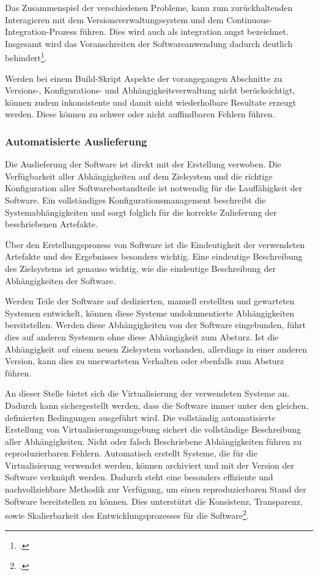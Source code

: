 Das Zusammenspiel der verschiedenen Probleme, kann zum zurückhaltenden Interagieren mit dem Versionsverwaltungssystem und dem Continuous-Integration-Prozess führen. Dies wird auch als \glqq integration angst\grqq{} bezeichnet. Insgesamt wird das Voranschreiten der Softwareanwendung dadurch deutlich behindert\footcite[vgl.][S. 3 ff]{ci-is-not-build-systems}.

Werden bei einem Build-Skript Aspekte der vorangegangen Abschnitte zu Versions-, Konfigurations- und Abhängigkeitsverwaltung nicht berücksichtigt, können zudem inkonsistente und damit nicht
wiederholbare Resultate erzeugt werden. Diese können zu schwer oder nicht auffindbaren Fehlern führen.

\subsubsection{Automatisierte Auslieferung}

Die Auslieferung der Software ist direkt mit der Erstellung verwoben. Die Verfügbarkeit aller Abhängigkeiten auf dem Zielsystem und die richtige Konfiguration aller Softwarebestandteile ist notwendig für die Lauffähigkeit der Software.
Ein vollständiges Konfigurationsmanagement beschreibt die Systemabhängigkeiten und sorgt folglich für die korrekte Zulieferung der beschriebenen Artefakte.

Über den Erstellungsprozess von Software ist die Eindeutigkeit der verwendeten Artefakte und des Ergebnisses besonders wichtig. Eine eindeutige Beschreibung des Zielsystems ist genauso wichtig, wie die eindeutige Beschreibung der Abhängigkeiten der Software.

Werden Teile der Software auf dedizierten, manuell erstellten und gewarteten Systemen entwickelt, können diese Systeme undokumentierte Abhängigkeiten bereitstellen. Werden diese Abhängigkeiten von der Software eingebunden, führt dies auf anderen Systemen ohne diese Abhängigkeit zum Absturz. Ist die Abhängigkeit auf einem neuen Zielsystem vorhanden, allerdings in einer anderen Version, kann dies zu unerwartetem Verhalten oder ebenfalls zum Absturz führen.

An dieser Stelle bietet sich die Virtualisierung der verwendeten Systeme an. Dadurch kann sichergestellt werden, dass die Software immer unter den gleichen, definierten Bedingungen ausgeführt wird. Die vollständig automatisierte Erstellung von Virtualisierungsumgebung sichert die vollständige Beschreibung aller Abhängigkeiten. Nicht oder falsch Beschriebene Abhängigkeiten führen zu reproduzierbaren Fehlern.
Automatisch erstellt Systeme, die für die Virtualisierung verwendet werden, können archiviert und mit der Version der Software verknüpft werden. Dadurch steht eine besonders effiziente und nachvollziehbare Methodik zur Verfügung, um einen reproduzierbaren Stand der Software bereitstellen zu können. Dies unterstützt die Konsistenz, Transparenz, sowie Skalierbarkeit des Entwicklungsprozesses für die Software\footcite[vgl.][Kap. Why are containers important?]{learn-docker}.

